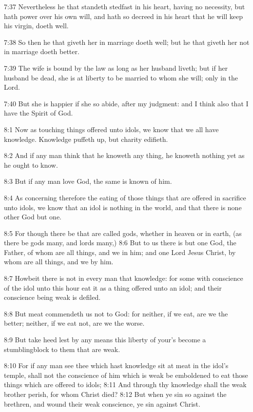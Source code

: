 7:37 Nevertheless he that standeth stedfast in his heart, having no necessity, but hath power over his own will, and hath so decreed in his heart that he will keep his virgin, doeth well.

7:38 So then he that giveth her in marriage doeth well; but he that giveth her not in marriage doeth better.

7:39 The wife is bound by the law as long as her husband liveth; but if her husband be dead, she is at liberty to be married to whom she will; only in the Lord.

7:40 But she is happier if she so abide, after my judgment: and I think also that I have the Spirit of God.

8:1 Now as touching things offered unto idols, we know that we all have knowledge. Knowledge puffeth up, but charity edifieth.

8:2 And if any man think that he knoweth any thing, he knoweth nothing yet as he ought to know.

8:3 But if any man love God, the same is known of him.

8:4 As concerning therefore the eating of those things that are offered in sacrifice unto idols, we know that an idol is nothing in the world, and that there is none other God but one.

8:5 For though there be that are called gods, whether in heaven or in earth, (as there be gods many, and lords many,) 8:6 But to us there is but one God, the Father, of whom are all things, and we in him; and one Lord Jesus Christ, by whom are all things, and we by him.

8:7 Howbeit there is not in every man that knowledge: for some with conscience of the idol unto this hour eat it as a thing offered unto an idol; and their conscience being weak is defiled.

8:8 But meat commendeth us not to God: for neither, if we eat, are we the better; neither, if we eat not, are we the worse.

8:9 But take heed lest by any means this liberty of your's become a stumblingblock to them that are weak.

8:10 For if any man see thee which hast knowledge sit at meat in the idol's temple, shall not the conscience of him which is weak be emboldened to eat those things which are offered to idols; 8:11 And through thy knowledge shall the weak brother perish, for whom Christ died?  8:12 But when ye sin so against the brethren, and wound their weak conscience, ye sin against Christ.

